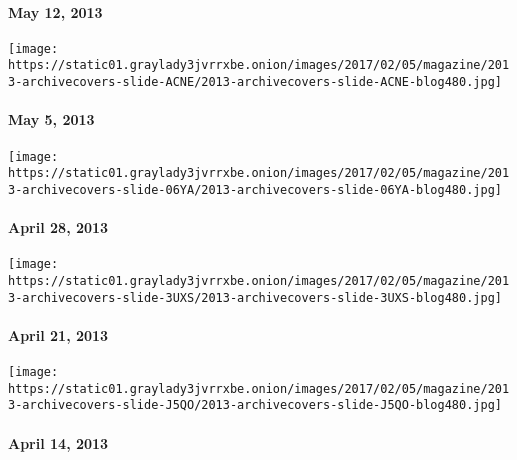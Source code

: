 \hypertarget{may-12-2013}{%
\paragraph{May 12, 2013}\label{may-12-2013}}

\href{http://www.nytimes3xbfgragh.onion/indexes/2013/05/05/magazine/index.html}{}

\texttt{[image: https://static01.graylady3jvrrxbe.onion/images/2017/02/05/magazine/2013-archivecovers-slide-ACNE/2013-archivecovers-slide-ACNE-blog480.jpg]}

\hypertarget{may-5-2013}{%
\paragraph{May 5, 2013}\label{may-5-2013}}

\href{http://www.nytimes3xbfgragh.onion/indexes/2013/04/28/magazine/index.html}{}

\texttt{[image: https://static01.graylady3jvrrxbe.onion/images/2017/02/05/magazine/2013-archivecovers-slide-06YA/2013-archivecovers-slide-06YA-blog480.jpg]}

\hypertarget{april-28-2013}{%
\paragraph{April 28, 2013}\label{april-28-2013}}

\href{http://www.nytimes3xbfgragh.onion/indexes/2013/04/21/magazine/index.html}{}

\texttt{[image: https://static01.graylady3jvrrxbe.onion/images/2017/02/05/magazine/2013-archivecovers-slide-3UXS/2013-archivecovers-slide-3UXS-blog480.jpg]}

\hypertarget{april-21-2013}{%
\paragraph{April 21, 2013}\label{april-21-2013}}

\href{http://www.nytimes3xbfgragh.onion/indexes/2013/04/14/magazine/index.html}{}

\texttt{[image: https://static01.graylady3jvrrxbe.onion/images/2017/02/05/magazine/2013-archivecovers-slide-J5QO/2013-archivecovers-slide-J5QO-blog480.jpg]}

\hypertarget{april-14-2013}{%
\paragraph{April 14, 2013}\label{april-14-2013}}

